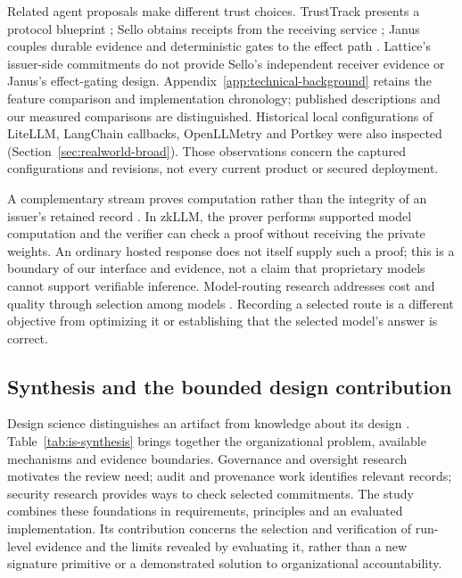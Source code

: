 \documentclass[11pt]{article}
\begin{document}
Related agent proposals make different trust choices. TrustTrack presents a protocol blueprint \citep{li2025trusttrack}; Sello obtains receipts from the receiving service \citep{figuera2026sello}; Janus couples durable evidence and deterministic gates to the effect path \citep{arslan2026janus}. Lattice's issuer-side commitments do not provide Sello's independent receiver evidence or Janus's effect-gating design. Appendix~\ref{app:technical-background} retains the feature comparison and implementation chronology; published descriptions and our measured comparisons are distinguished. Historical local configurations of LiteLLM, LangChain callbacks, OpenLLMetry and Portkey were also inspected (Section~\ref{sec:realworld-broad}). Those observations concern the captured configurations and revisions, not every current product or secured deployment.

A complementary stream proves computation rather than the integrity of an issuer's retained record \citep{kang2022zk,sun2024}. In zkLLM, the prover performs supported model computation and the verifier can check a proof without receiving the private weights. An ordinary hosted response does not itself supply such a proof; this is a boundary of our interface and evidence, not a claim that proprietary models cannot support verifiable inference. Model-routing research addresses cost and quality through selection among models \citep{chen2023frugalgpt,ong2024routellm}. Recording a selected route is a different objective from optimizing it or establishing that the selected model's answer is correct.

\subsection{Synthesis and the bounded design contribution}

Design science distinguishes an artifact from knowledge about its design \citep{hevner2004,gregor2007,gregor2013}. Table~\ref{tab:is-synthesis} brings together the organizational problem, available mechanisms and evidence boundaries. Governance and oversight research motivates the review need; audit and provenance work identifies relevant records; security research provides ways to check selected commitments. The study combines these foundations in requirements, principles and an evaluated implementation. Its contribution concerns the selection and verification of run-level evidence and the limits revealed by evaluating it, rather than a new signature primitive or a demonstrated solution to organizational accountability.
\end{document}
